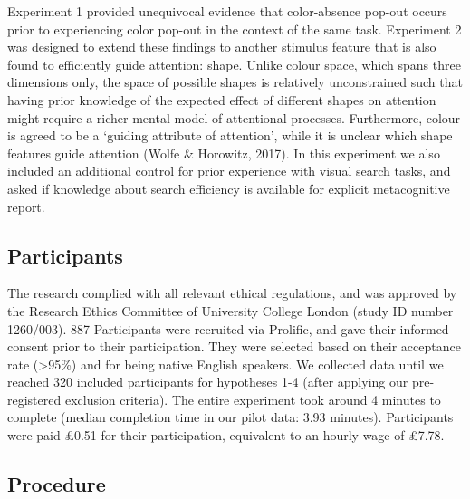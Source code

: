 \documentclass[12pt,twoside]{reedthesis}
\begin{document}
Experiment 1 provided unequivocal evidence that color-absence pop-out occurs prior to experiencing color pop-out in the context of the same task. Experiment 2 was designed to extend these findings to another stimulus feature that is also found to efficiently guide attention: shape. Unlike colour space, which spans three dimensions only, the space of possible shapes is relatively unconstrained such that having prior knowledge of the expected effect of different shapes on attention might require a richer mental model of attentional processes. Furthermore, colour is agreed to be a `guiding attribute of attention', while it is unclear which shape features guide attention (Wolfe \& Horowitz, 2017). In this experiment we also included an additional control for prior experience with visual search tasks, and asked if knowledge about search efficiency is available for explicit metacognitive report.

\hypertarget{participants-1}{%
\subsection{Participants}\label{participants-1}}

The research complied with all relevant ethical regulations, and was approved by the Research Ethics Committee of University College London (study ID number 1260/003). 887 Participants were recruited via Prolific, and gave their informed consent prior to their participation. They were selected based on their acceptance rate (\textgreater95\%) and for being native English speakers. We collected data until we reached 320 included participants for hypotheses 1-4 (after applying our pre-registered exclusion criteria). The entire experiment took around 4 minutes to complete (median completion time in our pilot data: 3.93 minutes). Participants were paid £0.51 for their participation, equivalent to an hourly wage of £7.78.

\hypertarget{procedure-1}{%
\subsection{Procedure}\label{procedure-1}}
\end{document}
